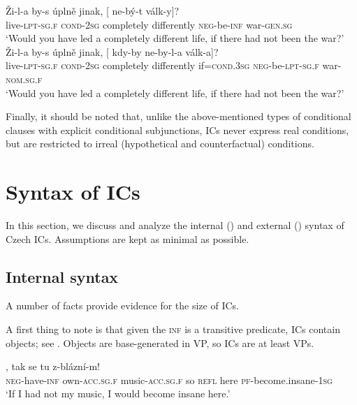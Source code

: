 \documentclass[output=paper,colorlinks,citecolor=brown,
modfonts,newtxmath
]{langscibook}
\begin{document}
\begin{enumerate}
\ea\label{ex:war2}
\ea
\gll Ži-l-a by-s úplně jinak, [\hspace{-2pt} ne-bý-t válk-y]?\\ 
     live-\textsc{lpt-sg.f} \textsc{cond-2sg} completely differently {} \textsc{neg}-be-\textsc{inf} war-\textsc{gen.sg}\\
\glt `Would you have led a completely different life, if there had not been the war?'
\ex
\gll Ži-l-a by-s úplně jinak, [\hspace{-2pt} kdy-by ne-by-l-a válk-a]?\\
     live-\textsc{lpt-sg.f} \textsc{cond-2sg} completely differently  {} if=\textsc{cond.3sg} \textsc{neg}-be-\textsc{lpt-sg.f} war-\textsc{nom.sg.f}\\
\glt `Would you have led a completely different life, if there had not been the war?'
\z
\z

Finally, it should be noted that, unlike the above-mentioned types of conditional clauses with explicit conditional subjunctions, ICs never express real conditions, but are restricted to irreal (hypothetical and counterfactual) conditions.

\end{enumerate}


\section{Syntax of ICs}\label{sec:syntax}

In this section, we discuss and analyze the internal () and external () syntax of Czech ICs. Assumptions are kept as minimal as possible.

\subsection{Internal syntax}\label{sec:syntax_internal}

A number of facts provide evidence for the size of ICs.

A first thing to note is that given the \textsc{inf} is a transitive predicate, ICs contain objects; see . Objects are base-generated in VP, so ICs are at least VPs.

\ea\label{ex:music2}
, tak se tu z-blázní-m!\\
     {} \textsc{neg}-have-\textsc{inf} own-\textsc{acc.sg.f} music-\textsc{acc.sg.f} so \textsc{refl} here \textsc{pf}-{become.insane}-\textsc{1sg}\\
\glt `If I had not my music, I would become insane here.' \\ \hfill \citep[Czech;][4]{Milotova2012}
\z
\end{document}
